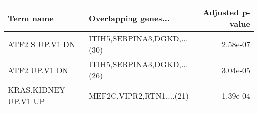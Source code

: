 \begin{tabular}{llr}
\toprule
           Term name &        Overlapping genes... &  Adjusted p-value \\
\midrule
     ATF2 S UP.V1 DN & ITIH5,SERPINA3,DGKD,...(30) &          2.58e-07 \\
       ATF2 UP.V1 DN & ITIH5,SERPINA3,DGKD,...(26) &          3.04e-05 \\
KRAS.KIDNEY UP.V1 UP &    MEF2C,VIPR2,RTN1,...(21) &          1.39e-04 \\
\bottomrule
\end{tabular}
